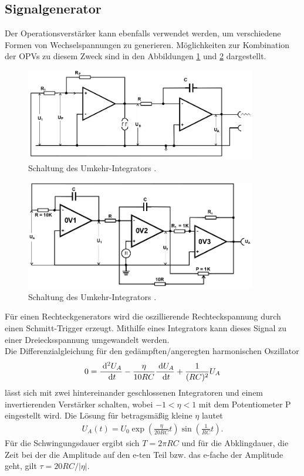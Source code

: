 \subsection{Signalgenerator}
Der Operationsverstärker kann ebenfalls verwendet werden, um verschiedene Formen
von Wechselspannungen zu generieren. Möglichkeiten zur Kombination der OPVs 
zu diesem Zweck sind in den Abbildungen \ref{pic:dreiRect}
und \ref{pic:sinus} dargestellt.
\begin{figure}[t]
 \includegraphics[width = 0.9\textwidth]{../pics/DreiRect.png}
 \caption{Schaltung des Umkehr-Integrators \cite{Anl}.}
 \label{pic:dreiRect}
\end{figure}
\begin{figure}[t]
 \includegraphics[width = 0.9\textwidth]{../pics/sinus.png}
 \caption{Schaltung des Umkehr-Integrators \cite{Anl}.}
 \label{pic:sinus}
\end{figure}
Für einen Rechteckgenerators wird die oszillierende Rechteckspannung durch einen
Schmitt-Trigger erzeugt. Mithilfe eines Integrators kann dieses Signal 
zu einer Dreiecksspannung umgewandelt werden.\\
\noindent Die Differenzialgleichung für den gedämpften/angeregten
harmonischen Oszillator
\begin{align}
 0 = \frac{\; \mathrm{d}^2 U_A}{\; \mathrm{d} t}- \frac{\eta}{10 RC} \frac{\; \mathrm{d} U_A}{\; \mathrm{d} t} + \frac{1}{(RC)^2}U_A
\end{align}
lässt sich mit zwei hintereinander geschlossenen Integratoren und einem invertierenden
Verstärker schalten, wobei $-1<\eta<1$ mit dem Potentiometer P eingestellt wird. Die Lösung
für betragsmäßig kleine $\eta$ lautet
\begin{align}
 U_A(t) = U_0 \exp\left(\frac{\eta}{20RC}t\right) \sin\left(\frac{1}{RC}t\right).
\end{align}
Für die Schwingungsdauer ergibt sich $T=2\pi RC$ und für die Abklingdauer,
die Zeit bei der die Amplitude auf den e-ten Teil bzw. das e-fache der Amplitude geht,
gilt $\tau = 20RC/|\eta|$.

